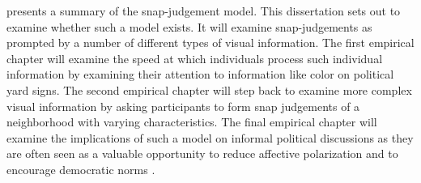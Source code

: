 \documentclass [12pt]{article}
\begin{document}
 presents a summary of the snap-judgement model. This dissertation sets out to examine whether such a model exists. It will examine snap-judgements as prompted by a number of different types of visual information. The first empirical chapter will examine the speed at which individuals process such individual information by examining their attention to information like color on political yard signs. The second empirical chapter will step back to examine more complex visual information by asking participants to form snap judgements of a neighborhood with varying characteristics. The final empirical chapter will examine the implications of such a model on informal political discussions as they are often seen as a valuable opportunity to reduce affective polarization and to encourage democratic norms \citep{levendusky_stecula_2021, santoro_broockman_2022_sa}. 
\end{document}
